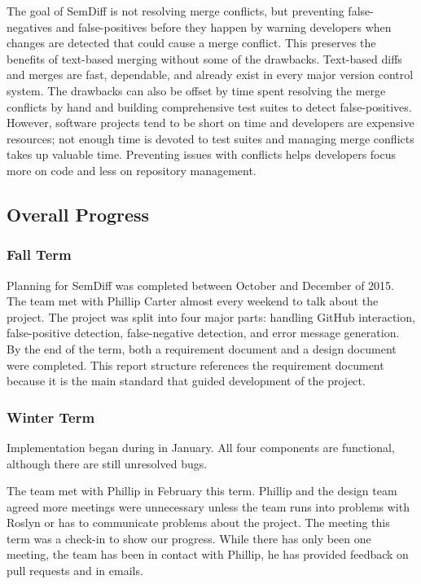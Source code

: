 \documentclass[draftclsnofoot,onecolumn]{IEEEtran}
\begin{document}
The goal of SemDiff is not resolving merge conflicts, but preventing 
false-negatives and false-positives before they happen by warning developers 
when changes are detected that could cause a merge conflict. This preserves the 
benefits of text-based merging without some of the drawbacks. Text-based diffs 
and merges are fast, dependable, and already exist in every major version 
control system. The drawbacks can also be offset by time spent resolving the 
merge conflicts by hand and building comprehensive test suites to detect 
false-positives. However, software projects tend to be short on time and 
developers are expensive resources; not enough time is devoted to test suites 
and managing merge conflicts takes up valuable time. Preventing issues with 
conflicts helps developers focus more on code and less on repository management.

\subsection{Overall Progress}%

\subsubsection{Fall Term}

Planning for SemDiff was completed between October and December of 2015. The 
team met with Phillip Carter almost every weekend to talk about the project. 
The project was split into four major parts: handling GitHub interaction, 
false-positive detection, false-negative detection, and error message 
generation. By the end of the term, both a requirement document and a design 
document were completed. This report structure references the requirement 
document because it is the main standard that guided development of the project.

\subsubsection{Winter Term}

Implementation began during in January. All four components are functional, 
although there are still unresolved bugs. 

The team met with Phillip in February this term. Phillip and the design team 
agreed more meetings were unnecessary unless the team runs into problems with 
Roslyn or has to communicate problems about the project. The meeting this term 
was a check-in to show our progress. While there has only been one meeting, the 
team has been in contact with Phillip, he has provided feedback on pull requests 
and in emails.
\end{document}
